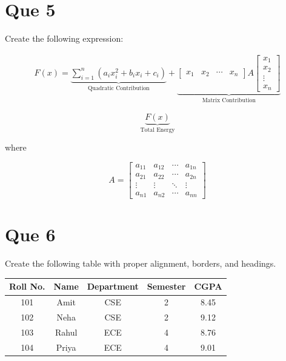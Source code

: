 \documentclass[12pt,a4paper]{article}
\begin{document}
	\section*{Que 5}
	
	Create the following expression:
	
	\[
	\begin{aligned}
		F(x)=
		\underbrace{
			\sum_{i=1}^{n}
			\left(a_i x_i^2+b_i x_i+c_i\right)
		}_{\text{Quadratic Contribution}}
		+
		\underbrace{
			\begin{bmatrix}
				x_1 & x_2 & \cdots & x_n
			\end{bmatrix}
			A
			\begin{bmatrix}
				x_1\\
				x_2\\
				\vdots\\
				x_n
			\end{bmatrix}
		}_{\text{Matrix Contribution}}
	\end{aligned}
	\]
	
	\[
	\underbrace{F(x)}_{\text{Total Energy}}
	\]
	
	where
	
	\[
	A=
	\begin{bmatrix}
		a_{11} & a_{12} & \cdots & a_{1n}\\
		a_{21} & a_{22} & \cdots & a_{2n}\\
		\vdots & \vdots & \ddots & \vdots\\
		a_{n1} & a_{n2} & \cdots & a_{nn}
	\end{bmatrix}
	\]
	
	\section*{Que 6}
	
	Create the following table with proper alignment, borders, and headings.
	
	\begin{center}
		\begin{tabular}{|c|c|c|c|c|}
			\hline
			\textbf{Roll No.} & \textbf{Name} & \textbf{Department} & \textbf{Semester} & \textbf{CGPA}\\
			\hline
			101 & Amit & CSE & 2 & 8.45\\
			\hline
			102 & Neha & CSE & 2 & 9.12\\
			\hline
			103 & Rahul & ECE & 4 & 8.76\\
			\hline
			104 & Priya & ECE & 4 & 9.01\\
			\hline
		\end{tabular}
	\end{center}
	
\end{document}
